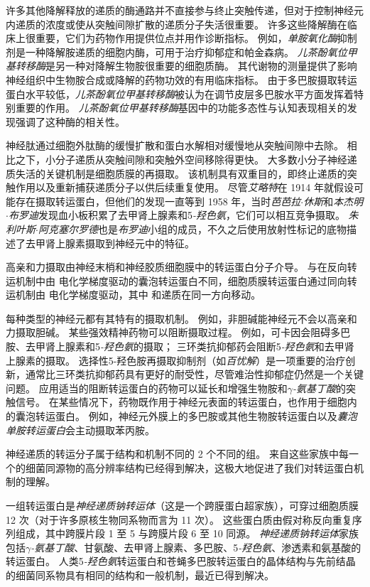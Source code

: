 许多其他降解释放的递质的酶通路并不直接参与终止突触传递，但对于控制神经元内递质的浓度或使从突触间隙扩散的递质分子失活很重要。
许多这些降解酶在临床上很重要，它们为药物作用提供位点并用作诊断指标。
例如，\textit{单胺氧化酶}抑制剂是一种降解胺递质的细胞内酶，可用于治疗抑郁症和帕金森病。
\textit{儿茶酚氧位甲基转移酶}是另一种对降解生物胺很重要的细胞质酶。
其代谢物的测量提供了影响神经组织中生物胺合成或降解的药物功效的有用临床指标。
由于多巴胺摄取转运蛋白水平较低，\textit{儿茶酚氧位甲基转移酶}被认为在调节皮层多巴胺水平方面发挥着特别重要的作用。
\textit{儿茶酚氧位甲基转移酶}基因中的功能多态性与认知表现相关的发现强调了这种酶的相关性。


神经肽通过细胞外肽酶的缓慢扩散和蛋白水解相对缓慢地从突触间隙中去除。
相比之下，小分子递质从突触间隙和突触外空间移除得更快。
大多数小分子神经递质失活的关键机制是细胞质膜的再摄取。
该机制具有双重目的，即终止递质的突触作用以及重新捕获递质分子以供后续重复使用。
尽管\textit{艾略特}在 1914 年就假设可能存在摄取转运蛋白，但他们的发现一直等到 1958 年，当时\textit{芭芭拉$\cdot$休斯}和\textit{本杰明$\cdot$布罗迪}发现血小板积累了去甲肾上腺素和5\textit{-羟色氨}，它们可以相互竞争摄取。
\textit{朱利叶斯$\cdot$阿克塞尔罗德}也是\textit{布罗迪}小组的成员，不久之后使用放射性标记的底物描述了去甲肾上腺素摄取到神经元中的特征。


高亲和力摄取由神经末梢和神经胶质细胞膜中的转运蛋白分子介导。
与在反向转运机制中由  电化学梯度驱动的囊泡转运蛋白不同，细胞质膜转运蛋白通过同向转运机制由  电化学梯度驱动，其中  和递质在同一方向移动。


每种类型的神经元都有其特有的摄取机制。
例如，非胆碱能神经元不会以高亲和力摄取胆碱。
某些强效精神药物可以阻断摄取过程。
例如，可卡因会阻碍多巴胺、去甲肾上腺素和5\textit{-羟色氨}的摄取；
三环类抗抑郁药会阻断5\textit{-羟色氨}和去甲肾上腺素的摄取。
选择性5-羟色胺再摄取抑制剂（如\textit{百忧解}）是一项重要的治疗创新，通常比三环类抗抑郁药具有更好的耐受性，尽管难治性抑郁症仍然是一个关键问题。
应用适当的阻断转运蛋白的药物可以延长和增强生物胺和\textit{$\gamma$-氨基丁酸}的突触信号。
在某些情况下，药物既作用于神经元表面的转运蛋白，也作用于细胞内的囊泡转运蛋白。
例如，神经元外膜上的多巴胺或其他生物胺转运蛋白以及\textit{囊泡单胺转运蛋白}会主动摄取苯丙胺。


神经递质的转运分子属于结构和机制不同的 2 个不同的组。
来自这些家族中每一个的细菌同源物的高分辨率结构已经得到解决，这极大地促进了我们对转运蛋白机制的理解。


一组转运蛋白是\textit{神经递质钠转运体}（这是一个跨膜蛋白超家族），可穿过细胞质膜 12 次（对于许多原核生物同系物而言为 11 次）。
这些蛋白质由假对称反向重复序列组成，其中跨膜片段 1 至 5 与跨膜片段 6 至 10 同源。
\textit{神经递质钠转运体}家族包括\textit{$\gamma$-氨基丁酸}、甘氨酸、去甲肾上腺素、多巴胺、5\textit{-羟色氨}、渗透素和氨基酸的转运蛋白。
人类5\textit{-羟色氨}转运蛋白和苍蝇多巴胺转运蛋白的晶体结构与先前结晶的细菌同系物具有相同的结构和一般机制，最近已得到解决。


